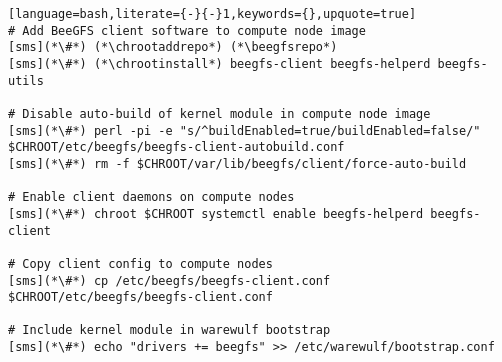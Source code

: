 \begin{lstlisting}[language=bash,literate={-}{-}1,keywords={},upquote=true]
# Add BeeGFS client software to compute node image
[sms](*\#*) (*\chrootaddrepo*) (*\beegfsrepo*)
[sms](*\#*) (*\chrootinstall*) beegfs-client beegfs-helperd beegfs-utils

# Disable auto-build of kernel module in compute node image
[sms](*\#*) perl -pi -e "s/^buildEnabled=true/buildEnabled=false/" $CHROOT/etc/beegfs/beegfs-client-autobuild.conf
[sms](*\#*) rm -f $CHROOT/var/lib/beegfs/client/force-auto-build

# Enable client daemons on compute nodes
[sms](*\#*) chroot $CHROOT systemctl enable beegfs-helperd beegfs-client

# Copy client config to compute nodes
[sms](*\#*) cp /etc/beegfs/beegfs-client.conf $CHROOT/etc/beegfs/beegfs-client.conf

# Include kernel module in warewulf bootstrap
[sms](*\#*) echo "drivers += beegfs" >> /etc/warewulf/bootstrap.conf
\end{lstlisting}
